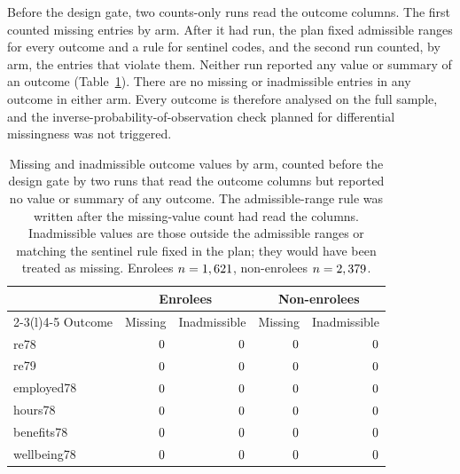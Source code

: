 \documentclass[11pt]{article}
\begin{document}
Before the design gate, two counts-only runs read the outcome columns. The first counted
missing entries by arm. After it had run, the plan fixed admissible ranges for every outcome
and a rule for sentinel codes, and the second run counted, by arm, the entries that violate
them. Neither run reported any value or summary of an outcome (Table~\ref{tab:missing}).
There are no missing or inadmissible entries in any outcome in either arm. Every outcome is therefore analysed on the full sample,
and the inverse-probability-of-observation check planned for differential missingness was
not triggered.

\begin{table}[tbp]
\centering
\caption{Missing and inadmissible outcome values by arm, counted before the design gate by
two runs that read the outcome columns but reported no value or summary of any outcome. The
admissible-range rule was written after the missing-value count had read the columns. Inadmissible values are those outside the admissible
ranges or matching the sentinel rule fixed in the plan; they would have been treated as
missing. Enrolees $n = 1,621$, non-enrolees $n = 2,379$.}
\label{tab:missing}
\small
\begin{tabular}{@{}l rr rr@{}}
\toprule
 & \multicolumn{2}{c}{Enrolees} & \multicolumn{2}{c}{Non-enrolees} \\
\cmidrule(lr){2-3}\cmidrule(l){4-5}
Outcome & Missing & Inadmissible & Missing & Inadmissible \\
\midrule
re78 & $0$ & $0$ & $0$ & $0$ \\
re79 & $0$ & $0$ & $0$ & $0$ \\
employed78 & $0$ & $0$ & $0$ & $0$ \\
hours78 & $0$ & $0$ & $0$ & $0$ \\
benefits78 & $0$ & $0$ & $0$ & $0$ \\
wellbeing78 & $0$ & $0$ & $0$ & $0$ \\
\bottomrule
\end{tabular}
\end{table}
\end{document}
